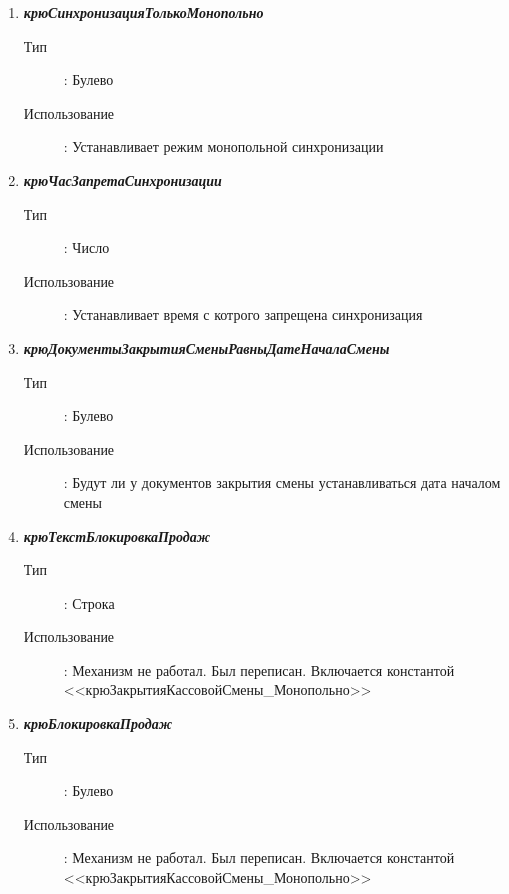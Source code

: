 \begin{enumerate}[label=(\arabic*)]
\vspace{\baselineskip}
\item \textbf{\textit{крюСинхронизацияТолькоМонопольно}}
\begin{description}
    \item[Тип] : Булево
    \item[Использование]: Устанавливает режим монопольной синхронизации
\end{description}

\vspace{\baselineskip}
\item \textbf{\textit{крюЧасЗапретаСинхронизации}}
\begin{description}
    \item[Тип] : Число
    \item[Использование]: Устанавливает время с котрого запрещена синхронизация
\end{description}


\vspace{\baselineskip}
\item \textbf{\textit{крюДокументыЗакрытияСменыРавныДатеНачалаСмены}}
\begin{description}
    \item[Тип] : Булево
    \item[Использование]: Будут ли у документов закрытия смены устанавливаться дата началом смены
\end{description}



\vspace{\baselineskip}
\item \textbf{\textit{крюТекстБлокировкаПродаж}}
\begin{description}
    \item[Тип] : Строка
    \item[Использование]: Механизм не работал. Был переписан. Включается константой <<крюЗакрытияКассовойСмены\_Монопольно>>
\end{description}


\vspace{\baselineskip}
\item \textbf{\textit{крюБлокировкаПродаж}}
\begin{description}
    \item[Тип] : Булево
    \item[Использование]: Механизм не работал. Был переписан. Включается константой <<крюЗакрытияКассовойСмены\_Монопольно>>
\end{description}


\end{enumerate}
